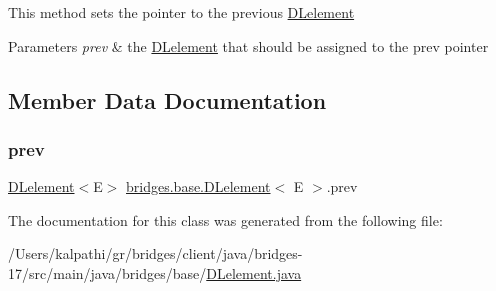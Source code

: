 This method sets the pointer to the previous \mbox{\hyperlink{classbridges_1_1base_1_1_d_lelement}{D\+Lelement}}


\begin{DoxyParams}{Parameters}
{\em prev} & the \mbox{\hyperlink{classbridges_1_1base_1_1_d_lelement}{D\+Lelement}} that should be assigned to the prev pointer \\
\hline
\end{DoxyParams}


\subsection{Member Data Documentation}
\mbox{\label{classbridges_1_1base_1_1_d_lelement_a6eba4876f820b75ac6bde01d7dea9da7}} 
\subsubsection{\texorpdfstring{prev}{prev}}
{\footnotesize\ttfamily \mbox{\hyperlink{classbridges_1_1base_1_1_d_lelement}{D\+Lelement}}$<$E$>$ \mbox{\hyperlink{classbridges_1_1base_1_1_d_lelement}{bridges.\+base.\+D\+Lelement}}$<$ E $>$.prev\hspace{0.3cm}{\ttfamily [protected]}}



The documentation for this class was generated from the following file\+:\begin{DoxyCompactItemize}
\item 
/\+Users/kalpathi/gr/bridges/client/java/bridges-\/17/src/main/java/bridges/base/\mbox{\hyperlink{_d_lelement_8java}{D\+Lelement.\+java}}\end{DoxyCompactItemize}
